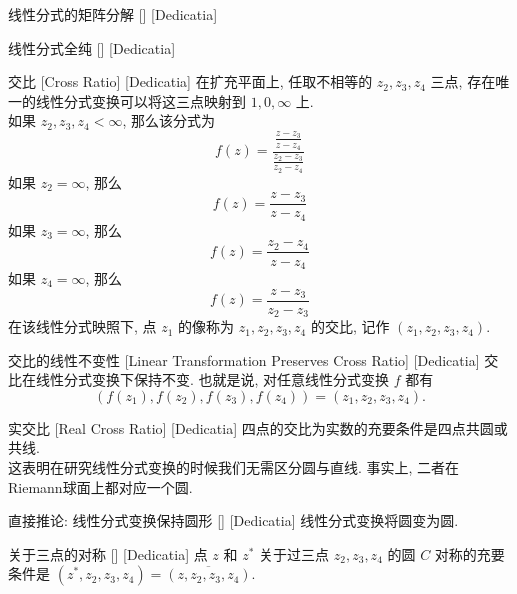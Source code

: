 \documentclass[UTF8]{ctexart}
\begin{document}
        \begin{ppt}
            [UUID]
            {线性分式的矩阵分解}
            []
            [Dedicatia]
        \end{ppt}

        \begin{ppt}
            [UUID]
            {线性分式全纯}
            []
            [Dedicatia]
        \end{ppt}
        
        \begin{dfn}
            [UUID]
            {交比}
            [Cross Ratio]
            [Dedicatia]
            在扩充平面上, 任取不相等的 \(z_2,z_3,z_4\) 三点, 存在唯一的线性分式变换可以将这三点映射到 \(1,0,\infty\) 上. \\
            如果 \(z_2,z_3,z_4<\infty\), 那么该分式为
            \[f(z)=\frac{\frac{z-z_3}{z-z_4}}{\frac{z_2-z_3}{z_2-z_4}}\]
            如果 \(z_2=\infty\), 那么
            \[f(z)=\frac{z-z_3}{z-z_4}\]
            如果 \(z_3=\infty\), 那么
            \[f(z)=\frac{z_2-z_4}{z-z_4}\]
            如果 \(z_4=\infty\), 那么
            \[f(z)=\frac{z-z_3}{z_2-z_3}\]
            在该线性分式映照下, 点 \(z_1\) 的像称为 \(z_1,z_2,z_3,z_4\) 的交比, 记作 \((z_1,z_2,z_3,z_4)\).
        \end{dfn}

        \begin{ppt}
            [UUID]
            {交比的线性不变性}
            [Linear Transformation Preserves Cross Ratio]
            [Dedicatia]
            交比在线性分式变换下保持不变. 也就是说, 对任意线性分式变换 \(f\) 都有
            \[(f(z_1),f(z_2),f(z_3),f(z_4))=(z_1,z_2,z_3,z_4).\]
        \end{ppt}

        \begin{ppt}
            [UUID]
            {实交比}
            [Real Cross Ratio]
            [Dedicatia]
            四点的交比为实数的充要条件是四点共圆或共线. \\
            这表明在研究线性分式变换的时候我们无需区分圆与直线. 事实上, 二者在Riemann球面上都对应一个圆. 
        \end{ppt}

        \begin{ppt}
            [UUID]
            {直接推论: 线性分式变换保持圆形}
            []
            [Dedicatia]
            线性分式变换将圆变为圆. 
        \end{ppt}
        
        \begin{ppt}
            [UUID]
            {关于三点的对称}
            []
            [Dedicatia]
            点 \(z\) 和 \(z^*\) 关于过三点 \(z_2,z_3,z_4\) 的圆 \(C\) 对称的充要条件是 \((z^*,z_2,z_3,z_4)=\overline{(z,z_2,z_3,z_4)}\).
        \end{ppt}
\end{document}
